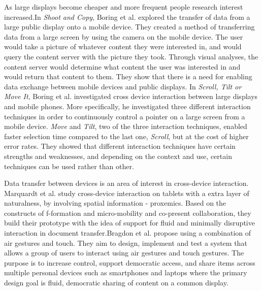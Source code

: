 As large displays become cheaper and more frequent people research interest increased.In \emph{Shoot and Copy}, Boring et al. \cite{Boring:2007} explored the transfer of data from a large public display onto a mobile device. They created a method of transferring data from a large screen by using the camera on the mobile device. The user would take a picture of whatever content they were interested in, and would query the content server with the picture they took. Through visual analyses, the content server would determine what content the user was interested in and would return that content to them. They show that there is a need for enabling data exchange between mobile devices and public displays. In \emph{Scroll, Tilt or Move It}, Boring et al. \cite{Boring:2009} investigated cross device interaction between large displays and mobile phones. More specifically, he investigated three different interaction techniques in order to continuously control a pointer on a large screen from a mobile device. \emph{Move} and \emph{Tilt}, two of the three interaction techniques, enabled faster selection time compared to the last one, \emph{Scroll}, but at the cost of higher error rates. They showed that different interaction techniques have certain strengths and weaknesses, and depending on the context and use, certain techniques can be used rather than other. 

Data transfer between devices is an area of interest in cross-device interaction. Marquardt et al. \cite{Marquardt:2012} study cross-device interaction on tablets with a extra layer of naturalness, by involving spatial information - proxemics.  Based on the constructs of f-formation and micro-mobility and co-present collaboration, they build their prototype with the idea of support for fluid and minimally disruptive interaction in document transfer.Bragdon et al.\cite{Bragdon:2011} propose using a combination of air gestures and touch. They aim to design, implement and test a system that allows a group of users to interact using air gestures and touch gestures. 
The purpose is to increase control, support democratic access, and share items across multiple personal devices such as smartphones and laptops where the primary design goal is fluid, democratic sharing of content on a common display.